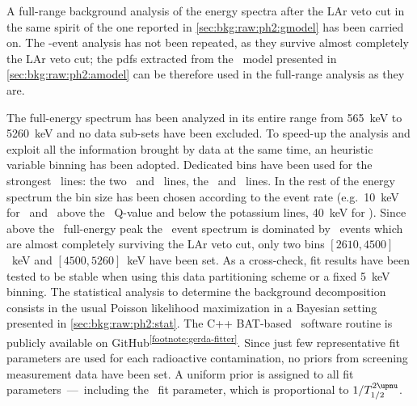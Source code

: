 A full-range background analysis of the energy spectra after the LAr veto cut in the same
spirit of the one reported in \cref{sec:bkg:raw:ph2:gmodel} has been carried on. The
\a-event analysis has not been repeated, as they survive almost completely the LAr veto
cut; the pdfs extracted from the \a\ model presented in \cref{sec:bkg:raw:ph2:amodel} can
be therefore used in the full-range analysis as they are.

The full-energy spectrum has been analyzed in its entire range from 565~keV to 5260~keV
and no data sub-sets have been excluded. To speed-up the analysis and exploit all the
information brought by data at the same time, an heuristic variable binning has been
adopted. Dedicated bins have been used for the strongest \g\ lines: the two \kvn\ and
\kvz\ lines, the \Bih\ and \Tl\ lines. In the rest of the energy spectrum the bin size has
been chosen according to the event rate (e.g.~10~keV for \enrBEGeII\ and \enrCoaxII\ above
the \Arl\ Q-value and below the potassium lines, 40~keV for \enrGeII). Since above the
\Tl\ full-energy peak the \Mone\ event spectrum is dominated by \a\ events which are
almost completely surviving the LAr veto cut, only two bins $[2610, 4500]$~keV and $[4500,
5260]$~keV have been set. As a cross-check, fit results have been tested to be stable when
using this data partitioning scheme or a fixed 5~keV binning.
\newpar
The statistical analysis to determine the background decomposition consists in the usual
Poisson likelihood maximization in a Bayesian setting presented in
\cref{sec:bkg:raw:ph2:stat}. The C++ BAT-based~\cite{Caldwell2008} software routine is
publicly available on GitHub\textsuperscript{\ref{footnote:gerda-fitter}}. Since just few
representative fit parameters are used for each radioactive contamination, no priors from
screening measurement data have been set. A uniform prior is assigned to all fit
parameters~---~including the \nnbb\ fit parameter, which is proportional to $1/\thalftwoM$.

